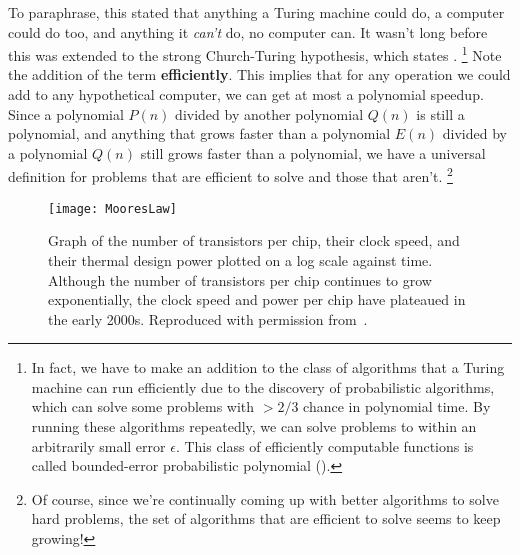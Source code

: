 To paraphrase, this stated that anything a Turing machine could do, a computer could do too, and anything
it \emph{can't} do, no computer can. It wasn't long before this was extended to the strong Church-Turing
hypothesis, which states .
\footnote{In fact, we have to make an addition to the class of algorithms that a Turing machine can run efficiently
 due to the discovery of probabilistic algorithms, which can solve some problems with $> 2/3$ chance in
 polynomial time. By running these algorithms repeatedly, we can solve problems to within an arbitrarily small
 error $\epsilon$. This class of efficiently computable functions is called bounded-error probabilistic polynomial ().}
Note the addition of the term \textbf{efficiently}. This implies that for any
operation we could add to any hypothetical computer, we can get at most a polynomial speedup. Since
a polynomial $P(n)$ divided by another polynomial $Q(n)$ is still a polynomial, and anything that grows faster
than a polynomial $E(n)$ divided by a polynomial $Q(n)$ still grows faster than a polynomial, we have
a universal definition for problems that are efficient to solve and those that aren't.
\footnote{Of course, since we're continually coming up with better algorithms to solve hard problems,
the set of algorithms that are efficient to solve seems to keep growing!}


\begin{figure}
  \texttt{[image: MooresLaw]}
  \caption[Moore's Law and the end of exponential scaling]
  {Graph of the number of transistors per chip, their clock speed, and their
  thermal design power plotted on a log scale against time. Although the number of transistors per chip
  continues to grow exponentially, the clock speed and power per chip have plateaued in the early 2000s.
  Reproduced with permission from~\cite{cross_2016}.}
  \label{fig:mooreslaw}
\end{figure}

